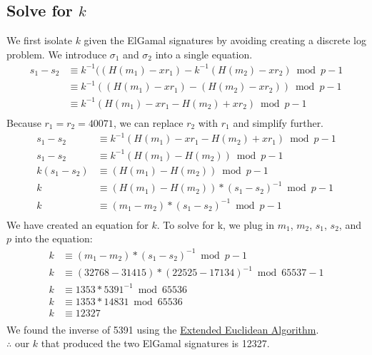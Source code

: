 \documentclass[12pt, letterpaper]{article}
\begin{document}
\begin{itemize}
\subsection{Solve for $k$}
We first isolate $k$ given the ElGamal signatures by avoiding creating a discrete log problem. We introduce $\sigma_1$ and $\sigma_2$ into a single equation.
\begin{equation*}
	\begin{split}
		s_1 - s_2 & \equiv k^{-1}((H(m_1)- xr_1) - k^{-1}(H(m_2)- xr_2) \bmod p-1 \\
		& \equiv k^{-1}((H(m_1)- xr_1) - (H(m_2)- xr_2)) \bmod p-1 \\
		& \equiv k^{-1}(H(m_1)- xr_1 - H(m_2)+ xr_2) \bmod p-1 \\
	\end{split}
\end{equation*}
Because $r_1 = r_2 = 40071$, we can replace $r_2$ with $r_1$ and simplify further.
\begin{equation*}
	\begin{split}
		s_1 - s_2 & \equiv k^{-1}(H(m_1)- xr_1 - H(m_2)+ xr_1) \bmod p-1 \\
		s_1 - s_2 & \equiv k^{-1}(H(m_1)- H(m_2)) \bmod p-1 \\
		k (s_1 - s_2) & \equiv (H(m_1)- H(m_2)) \bmod p-1 \\
		k & \equiv (H(m_1)- H(m_2)) * (s_1 - s_2)^{-1} \bmod p-1 \\
		k & \equiv (m_1- m_2) * (s_1 - s_2)^{-1} \bmod p-1 \\
	\end{split}
\end{equation*}
We have created an equation for $k$. To solve for k, we plug in $m_1$, $m_2$, $s_1$, $s_2$, and $p$ into the equation:
\begin{equation*}
	\begin{split}
		k & \equiv (m_1- m_2) * (s_1 - s_2)^{-1} \bmod p-1 \\
		k & \equiv (32768-31415) * (22525-17134)^{-1} \bmod 65537-1 \\
		k & \equiv 1353 * 5391^{-1} \bmod 65536 \\
		k & \equiv 1353 * 14831 \bmod 65536 \\
		k & \equiv 12327 \\
	\end{split}
\end{equation*}
We found the inverse of 5391 using the \href{https://en.wikibooks.org/wiki/Algorithm_Implementation/Mathematics/Extended_Euclidean_algorithm#Iterative_algorithm_3}{Extended Euclidean Algorithm}.\newline \\ $\therefore$ our $k$ that produced the two ElGamal signatures is 12327.


\end{itemize}
\end{document}
